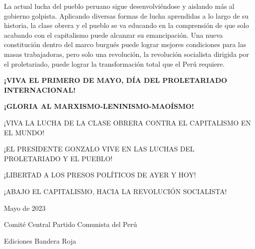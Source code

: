 \documentclass[
  letterpaper,
  DIV=11,
  numbers=noendperiod]{scrartcl}
\begin{document}
La actual lucha del pueblo peruano sigue desenvolviéndose y aislando más
al gobierno golpista. Aplicando diversas formas de lucha aprendidas a lo
largo de su historia, la clase obrera y el pueblo se va educando en la
comprensión de que solo acabando con el capitalismo puede alcanzar su
emancipación. Una nueva constitución dentro del marco burgués puede
lograr mejores condiciones para las masas trabajadoras, pero solo una
revolución, la revolución socialista dirigida por el proletariado, puede
lograr la transformación total que el Perú requiere.

\textbf{¡VIVA EL PRIMERO DE MAYO, DÍA DEL PROLETARIADO INTERNACIONAL!}

\textbf{¡GLORIA AL MARXISMO-LENINISMO-MAOÍSMO!}

¡VIVA LA LUCHA DE LA CLASE OBRERA CONTRA EL CAPITALISMO EN EL MUNDO!

¡EL PRESIDENTE GONZALO VIVE EN LAS LUCHAS DEL PROLETARIADO Y EL PUEBLO!

¡LIBERTAD A LOS PRESOS POLÍTICOS DE AYER Y HOY!

¡ABAJO EL CAPITALISMO, HACIA LA REVOLUCIÓN SOCIALISTA!

Mayo de 2023

Comité Central Partido Comunista del Perú

Ediciones Bandera Roja


\printbibliography
\end{document}
